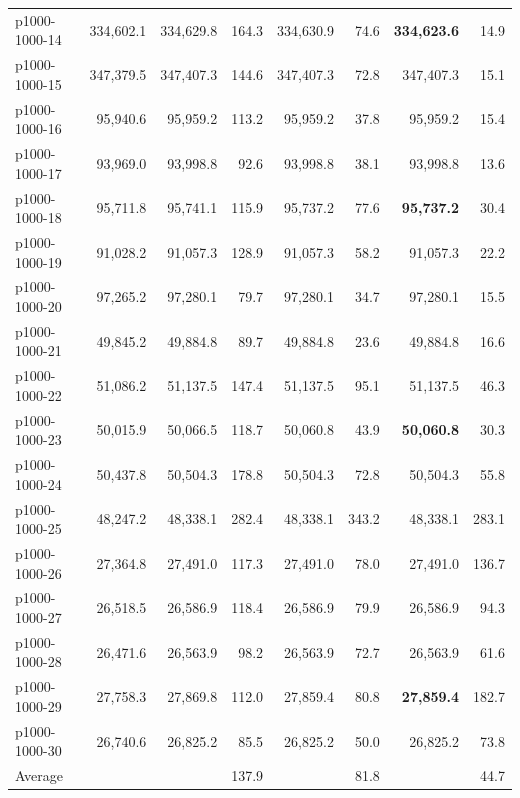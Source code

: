 \begin{table}[htbp]
\begin{tabular}{lrrrrrrr}
p1000-1000-14 &  334{,}602.1 &  334{,}629.8 & 164.3 &  334{,}630.9 &  74.6 & \textbf{334{,}623.6} &  14.9 \\
p1000-1000-15 &  347{,}379.5 &  347{,}407.3 & 144.6 &  347{,}407.3 &  72.8 &  347{,}407.3 &  15.1 \\
p1000-1000-16 &   95{,}940.6 &   95{,}959.2 & 113.2 &   95{,}959.2 &  37.8 &   95{,}959.2 &  15.4 \\
p1000-1000-17 &   93{,}969.0 &   93{,}998.8 &  92.6 &   93{,}998.8 &  38.1 &   93{,}998.8 &  13.6 \\
p1000-1000-18 &   95{,}711.8 &   95{,}741.1 & 115.9 &   95{,}737.2 &  77.6 &  \textbf{95{,}737.2} &  30.4 \\
p1000-1000-19 &   91{,}028.2 &   91{,}057.3 & 128.9 &   91{,}057.3 &  58.2 &   91{,}057.3 &  22.2 \\
p1000-1000-20 &   97{,}265.2 &   97{,}280.1 &  79.7 &   97{,}280.1 &  34.7 &   97{,}280.1 &  15.5 \\
p1000-1000-21 &   49{,}845.2 &   49{,}884.8 &  89.7 &   49{,}884.8 &  23.6 &   49{,}884.8 &  16.6 \\
p1000-1000-22 &   51{,}086.2 &   51{,}137.5 & 147.4 &   51{,}137.5 &  95.1 &   51{,}137.5 &  46.3 \\
p1000-1000-23 &   50{,}015.9 &   50{,}066.5 & 118.7 &   50{,}060.8 &  43.9 &  \textbf{50{,}060.8} &  30.3 \\
p1000-1000-24 &   50{,}437.8 &   50{,}504.3 & 178.8 &   50{,}504.3 &  72.8 &   50{,}504.3 &  55.8 \\
p1000-1000-25 &   48{,}247.2 &   48{,}338.1 & 282.4 &   48{,}338.1 & 343.2 &   48{,}338.1 & 283.1 \\
p1000-1000-26 &   27{,}364.8 &   27{,}491.0 & 117.3 &   27{,}491.0 &  78.0 &   27{,}491.0 & 136.7 \\
p1000-1000-27 &   26{,}518.5 &   26{,}586.9 & 118.4 &   26{,}586.9 &  79.9 &   26{,}586.9 &  94.3 \\
p1000-1000-28 &   26{,}471.6 &   26{,}563.9 &  98.2 &   26{,}563.9 &  72.7 &   26{,}563.9 &  61.6 \\
p1000-1000-29 &   27{,}758.3 &   27{,}869.8 & 112.0 &   27{,}859.4 &  80.8 &  \textbf{27{,}859.4} & 182.7 \\
p1000-1000-30 &   26{,}740.6 &   26{,}825.2 &  85.5 &   26{,}825.2 &  50.0 &   26{,}825.2 &  73.8 \\
\midrule
Average       &              &              & 137.9 &              &  81.8 &              &  44.7 \\
\bottomrule
\end{tabular}
\end{table}

